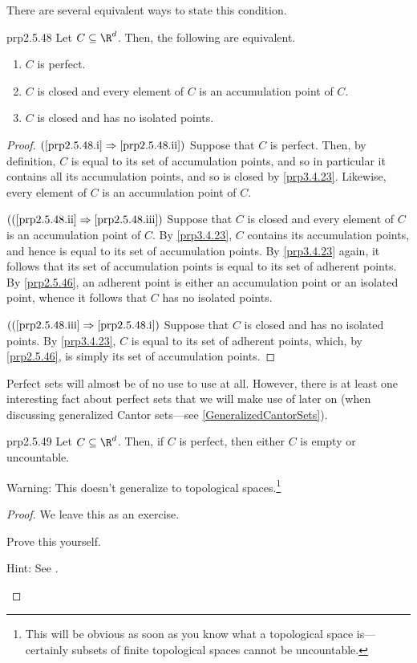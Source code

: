 There are several equivalent ways to state this condition.
\begin{prp}{}{prp2.5.48}
Let $C\subseteq \R ^d$.  Then, the following are equivalent.
\begin{enumerate}
\item \label{prp2.5.48.i}$C$ is perfect.
\item \label{prp2.5.48.ii}$C$ is closed and every element of $C$ is an accumulation point of $C$.
\item \label{prp2.5.48.iii}$C$ is closed and has no isolated points.
\end{enumerate}
\begin{proof}
$(\cref{prp2.5.48.i}\Rightarrow \cref{prp2.5.48.ii})$ Suppose that $C$ is perfect.  Then, by definition, $C$ is equal to its set of accumulation points, and so in particular it contains all its accumulation points, and so is closed by \cref{prp3.4.23}.  Likewise, every element of $C$ is an accumulation point of $C$.

\blankline
\noindent
$((\cref{prp2.5.48.ii}\Rightarrow \cref{prp2.5.48.iii})$ Suppose that $C$ is closed and every element of $C$ is an accumulation point of $C$.  By \cref{prp3.4.23}, $C$ contains its accumulation points, and hence is equal to its set of accumulation points.  By \cref{prp3.4.23} again, it follows that its set of accumulation points is equal to its set of adherent points.  By \cref{prp2.5.46}, an adherent point is either an accumulation point or an isolated point, whence it follows that $C$ has no isolated points.

\blankline
\noindent
$((\cref{prp2.5.48.iii}\Rightarrow \cref{prp2.5.48.i})$ Suppose that $C$ is closed and has no isolated points.  By \cref{prp3.4.23}, $C$ is equal to its set of adherent points, which, by \cref{prp2.5.46}, is simply its set of accumulation points.
\end{proof}
\end{prp}
Perfect sets will almost be of no use to use at all.  However, there is at least one interesting fact about perfect sets that we will make use of later on (when discussing generalized Cantor sets---see \cref{GeneralizedCantorSets}).
\begin{prp}{}{prp2.5.49}
Let $C\subseteq \R ^d$.  Then, if $C$ is perfect, then either $C$ is empty or uncountable.
\begin{wrn}
Warning:  This doesn't generalize to topological spaces.\footnote{This will be obvious as soon as you know what a topological space is---certainly subsets of finite topological spaces cannot be uncountable.}
\end{wrn}
\begin{proof}
We leave this as an exercise.
\begin{exr}{}{}
Prove this yourself.
\begin{rmk}
Hint:  See \cite[Theorem 3.4.3]{Abbott}.
\end{rmk}
\end{exr}
\end{proof}
\end{prp}

